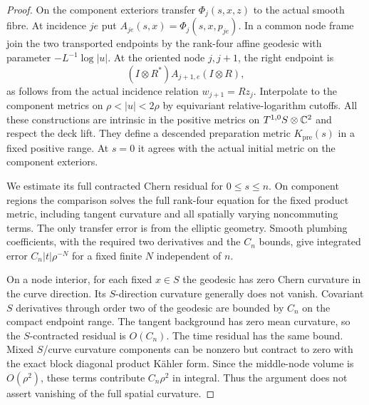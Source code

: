 \begin{proof}
On the component exteriors transfer $\Phi_j(s,x,z)$ to the actual
smooth fibre. At incidence $je$ put
$A_{je}(s,x)=\Phi_j(s,x,p_{je})$. In a common node frame join the
two transported endpoints by the rank-four affine geodesic with
parameter $-L^{-1}\log|u|$. At the oriented node $j,j+1$, the
right endpoint is
\[
 (I\otimes R^*)A_{j+1,e}(I\otimes R),
\]
as follows from the actual incidence relation $w_{j+1}=Rz_j$.
Interpolate to the component metrics on $\rho<|u|<2\rho$ by
equivariant relative-logarithm cutoffs. All these constructions are
intrinsic in the positive metrics on $T^{1,0}S\otimes\mathbb C^2$ and
respect the deck lift. They define a descended preparation metric
$K_{\mathrm{pre}}(s)$ in a fixed positive range. At $s=0$ it agrees
with the actual initial metric on the component exteriors.

We estimate its full contracted Chern residual for $0\le s\le n$.
On component regions the comparison solves the full rank-four
equation for the fixed product metric, including tangent curvature
and all spatially varying noncommuting terms. The only transfer
error is from the elliptic geometry. Smooth plumbing coefficients,
with the required two derivatives and the $C_n$ bounds, give integrated
error $C_n|t|\rho^{-N}$ for a fixed finite $N$ independent of $n$.

On a node interior, for each fixed $x\in S$ the geodesic has zero
Chern curvature in the curve direction. Its $S$-direction curvature
generally does not vanish. Covariant $S$ derivatives through order
two of the geodesic are bounded by $C_n$ on the compact endpoint
range. The tangent background has zero mean curvature, so the
$S$-contracted residual is $O(C_n)$. The time residual has the same
bound. Mixed $S$/curve curvature components can be nonzero but
contract to zero with the exact block diagonal product K\"ahler
form. Since the middle-node volume is $O(\rho^2)$, these terms
contribute $C_n\rho^2$ in integral. Thus the argument does not
assert vanishing of the full spatial curvature.


\end{proof}
